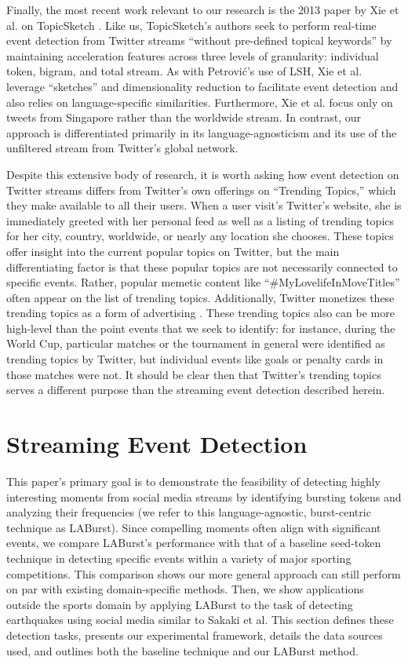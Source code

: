 \documentclass{sig-alternate}
\begin{document}
Finally, the most recent work relevant to our research is the 2013 paper by Xie et al. on TopicSketch \cite{xie2013topicsketch}.
Like us, TopicSketch's authors seek to perform real-time event detection from Twitter streams ``without pre-defined topical keywords'' by maintaining acceleration features across three levels of granularity: individual token, bigram, and total stream.
As with Petrovi\'{c}'s use of LSH, Xie et al. leverage ``sketches'' and dimensionality reduction to facilitate event detection and also relies on language-specific similarities.
Furthermore, Xie et al. focus only on tweets from Singapore rather than the worldwide stream.
In contrast, our approach is differentiated primarily in its language-agnosticism and its use of the unfiltered stream from Twitter's global network.

Despite this extensive body of research, it is worth asking how event detection on Twitter streams differs from Twitter's own offerings on ``Trending Topics,'' which they make available to all their users.
When a user visit's Twitter's website, she is immediately greeted with her personal feed as well as a listing of trending topics for her city, country, worldwide, or nearly any location she chooses.
These topics offer insight into the current popular topics on Twitter, but the main differentiating factor is that these popular topics are not necessarily connected to specific events.
Rather, popular memetic content like ``\#MyLovelifeInMoveTitles'' often appear on the list of trending topics.
Additionally, Twitter monetizes these trending topics as a form of advertising \cite{Sydell2011}.  
These trending topics also can be more high-level than the point events that we seek to identify: for instance, during the World Cup, particular matches or the tournament in general were identified as trending topics by Twitter, but individual events like goals or penalty cards in those matches were not.
It should be clear then that Twitter's trending topics serves a different purpose than the streaming event detection described herein.

\section{Streaming Event Detection}
\label{sect:methods}

This paper's primary goal is to demonstrate the feasibility of detecting highly interesting moments from social media streams by identifying bursting tokens and analyzing their frequencies (we refer to this language-agnostic, burst-centric technique as LABurst).
Since compelling moments often align with significant events, we compare LABurst's performance with that of a baseline seed-token technique in detecting specific events within a variety of major sporting competitions.
This comparison shows our more general approach can still perform on par with existing domain-specific methods.
Then, we show applications outside the sports domain by applying LABurst to the task of detecting earthquakes using social media similar to Sakaki et al.
This section defines these detection tasks, presents our experimental framework, details the data sources used, and outlines both the baseline technique and our LABurst method.
\end{document}
